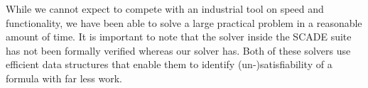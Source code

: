\begin{comment} 
The safety condition SC1 results in a SAT problem containing 8166 variables and 14716 clauses. It is unsatisfiable due to under-specification of the railway interlocking program which does not include all physical invariants. Out of 100 safety conditions available for the interlocking program, SC1 is the hardest to verify; most of the safety conditions are easily satisfiable. Our solver produces a proof showing that the safety condition is unsatisfiable, whereas the SCADE suite produces a counter example trace showing a sequence of states and transitions that lead to the safety condition being falsified. The results can be found in Table~\ref{tab:scade}.
\end{comment}
%
\begin{comment}
\begin{table}%
\caption{Performance compared to SCADE}
\label{tab:scade}
\begin{center}
{\small
\begin{tabular}{cccc}
  \toprule
  \text{Formula} & \multicolumn{2}{c}{\text{$\forallnc$ compiled}}  & \text{SCADE} \\ \cmidrule{2-3}
  &  \text{Yes/No} & \text{Witness} & \text{SAT/Counter Example}  \\ \midrule
  SC1 & 8s & 12s &  $<$1s \\ \bottomrule
\end{tabular}
}
\end{center}
\end{table}
\end{comment}
%
While we cannot expect to compete with an industrial tool on speed and functionality, we have been able to solve a large practical problem in a reasonable amount of time. It is important to note that the solver inside the SCADE suite has not been formally verified whereas our solver has. Both of these solvers use efficient data structures that enable them to identify (un-)satisfiability of a formula with far less work.   

